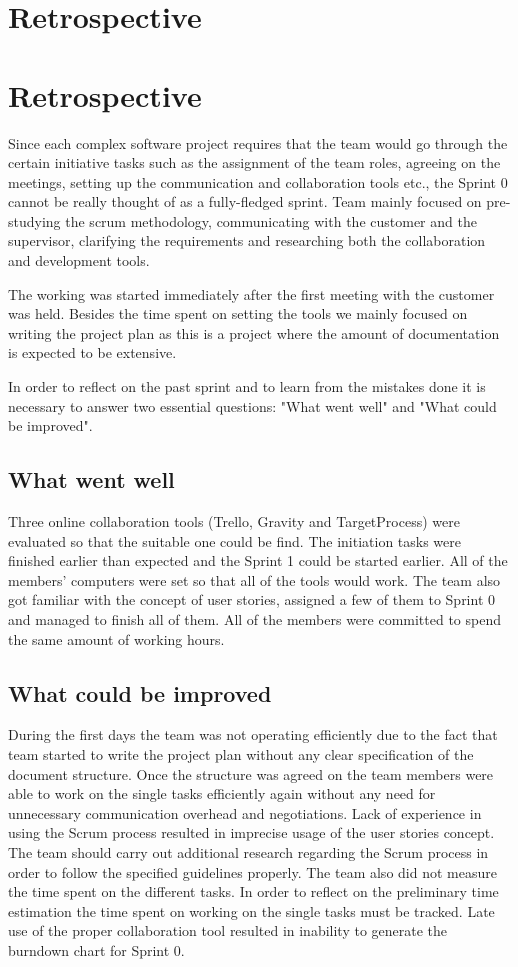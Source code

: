 \section{Retrospective}
\section{Retrospective}
Since each complex software project requires that the team would go through the certain initiative tasks such as the assignment of the team roles, agreeing on the meetings, setting up the communication and collaboration tools etc., the Sprint 0 cannot be really thought of as a fully-fledged sprint. Team mainly focused on pre-studying the scrum methodology, communicating with the customer and the supervisor, clarifying the requirements and researching both the collaboration and development tools.

The working was started immediately after the first meeting with the customer was held. Besides the time spent on setting the tools we mainly focused on writing the project plan as this is a project where the amount of documentation is expected to be extensive. 

In order to reflect on the past sprint and to learn from the mistakes done it is necessary to answer two essential questions: "What went well" and "What could be improved".

\subsection{What went well}
Three online collaboration tools (Trello, Gravity and TargetProcess) were evaluated so that the suitable one could be find. The initiation tasks were finished earlier than expected and the Sprint 1 could be started earlier. All of the members' computers were set so that all of the tools would work. The team also got familiar with the concept of user stories, assigned a few of them to Sprint 0 and managed to finish all of them. All of the members were committed to spend the same amount of working hours.

\subsection{What could be improved}
During the first days the team was not operating efficiently due to the fact that team started to write the project plan without any clear specification of the document structure. Once the structure was agreed on the team members were able to work on the single tasks efficiently again without any need for unnecessary communication overhead and negotiations. Lack of experience in using the Scrum process resulted in imprecise usage of the user stories concept. The team should carry out additional research regarding the Scrum process in order to follow the specified guidelines properly. The team also did not measure the time spent on the different tasks. In order to reflect on the preliminary time estimation the time spent on working on the single tasks must be tracked. Late use of the proper collaboration tool resulted in inability to generate the burndown chart for Sprint 0.